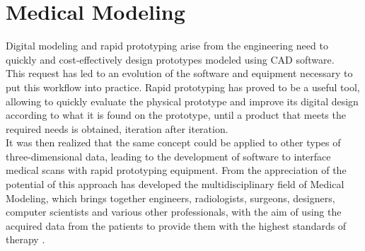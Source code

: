 
\chapter{Medical Modeling} %

\label{Chapter3} %
 

Digital modeling and rapid prototyping arise from the engineering need to quickly and cost-effectively design prototypes modeled using CAD software.\\
This request has led to an evolution of the software and equipment necessary to put this workflow into practice. Rapid prototyping has proved to be a useful tool, allowing to quickly evaluate the physical prototype and improve its digital design according to what it is found on the prototype, until a product that meets the required needs is obtained, iteration after iteration. \\
It was then realized that the same concept could be applied to other types of three-dimensional data, leading to the development of software to interface medical scans with rapid prototyping equipment. From the appreciation of the potential of this approach has developed the multidisciplinary field of Medical Modeling, which brings together engineers, radiologists, surgeons, designers, computer scientists and various other professionals, with the aim of using the acquired data from the patients to provide them with the highest standards of therapy \parencite{Reference1}.

